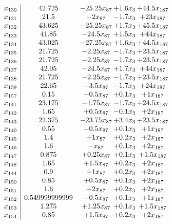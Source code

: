 \documentclass[11pt]{article}
\begin{document}
\[\begin{array}{c| c c@{\hskip 2pt} c@{\hskip 2pt} c@{\hskip 2pt} }
 x_{130}   &  42.725 & -25.25 x_{87} & + 1.6 x_{3} & + 44.5 x_{187}\\
 x_{131}   &  21.5 & -2 x_{87} & -1.7 x_{3} & + 23 x_{187}\\
 x_{132}   &  43.625 & -25.25 x_{87} & + 1.7 x_{3} & + 45.5 x_{187}\\
 x_{133}   &  41.85 & -24.5 x_{87} & + 1.5 x_{3} & + 44 x_{187}\\
 x_{134}   &  43.025 & -27.25 x_{87} & + 1.6 x_{3} & + 44.5 x_{187}\\
 x_{135}   &  21.725 & -2.25 x_{87} & -1.7 x_{3} & + 23.5 x_{187}\\
 x_{136}   &  21.725 & -2.25 x_{87} & -1.7 x_{3} & + 23.5 x_{187}\\
 x_{137}   &  42.05 & -24.5 x_{87} & + 1.7 x_{3} & + 44 x_{187}\\
 x_{138}   &  21.725 & -2.25 x_{87} & -1.7 x_{3} & + 23.5 x_{187}\\
 x_{139}   &  22.65 & -3.5 x_{87} & -1.7 x_{3} & + 24 x_{187}\\
 x_{157}   &  0.15 & -0.5 x_{87} & + 0.1 x_{3} & + 1 x_{187}\\
 x_{141}   &  23.175 & -1.75 x_{87} & -1.7 x_{3} & + 24.5 x_{187}\\
 x_{142}   &  1.65 & + 0.5 x_{87} & -0.1 x_{3} & + 2 x_{187}\\
 x_{143}   &  22.375 & -23.75 x_{87} & + 3.4 x_{3} & + 23.5 x_{187}\\
 x_{140}   &  0.55 & -0.5 x_{87} & + 0.1 x_{3} & + 1 x_{187}\\
 x_{145}   &  1.4 & + 1 x_{87} & + 0.2 x_{3} & + 2 x_{187}\\
 x_{146}   &  1.6 & - x_{87} & + 0.1 x_{3} & + 2 x_{187}\\
 x_{147}   &  0.875 & + 0.25 x_{87} & + 0.1 x_{3} & + 1.5 x_{187}\\
 x_{148}   &  1.65 & + 1.5 x_{87} & + 0.2 x_{3} & + 2 x_{187}\\
 x_{144}   &  0.9 & + 1 x_{87} & + 0.2 x_{3} & + 2 x_{187}\\
 x_{150}   &  0.85 & + 0.5 x_{87} & + 0.1 x_{3} & + 2 x_{187}\\
 x_{151}   &  1.6 & + 2 x_{87} & + 0.2 x_{3} & + 2 x_{187}\\
 x_{152}   &  0.549999999999 & -0.5 x_{87} & + 0.1 x_{3} & + 1 x_{187}\\
 x_{153}   &  1.275 & + 1.25 x_{87} & + 0.1 x_{3} & + 1.5 x_{187}\\
 x_{154}   &  0.85 & + 1.5 x_{87} & + 0.2 x_{3} & + 2 x_{187}\\

\end{array}\]
\end{document}
